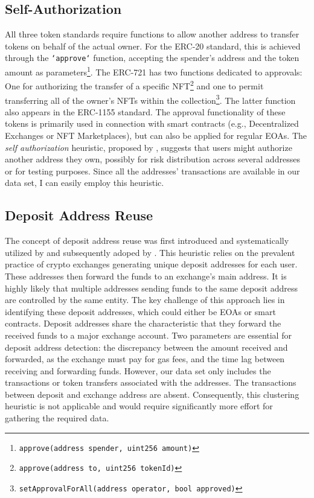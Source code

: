 \documentclass[12pt,a4paper,titlepage,oneside,english]{article}
\begin{document}
\subsection{Self-Authorization} 
	All three token standards require functions to allow another address to transfer tokens on behalf of the actual owner. For the ERC-20 standard, this is achieved through the \texttt{`approve`} function, accepting the spender's address and the token amount as parameters\footnote{\texttt{approve(address spender, uint256 amount)}}. The ERC-721 has two functions dedicated to approvals: One for authorizing the transfer of a specific NFT\footnote{\texttt{approve(address to, uint256 tokenId)}} and one to permit transferring all of the owner's NFTs within the collection\footnote{\texttt{setApprovalForAll(address operator, bool approved)}}. The latter function also appears in the ERC-1155 standard. The approval functionality of these tokens is primarily used in connection with smart contracts (e.g., Decentralized Exchanges or NFT Marketplaces), but can also be applied for regular EOAs. \newline
The \textit{self authorization} heuristic, proposed by \cite{FV:17}, suggests that users might authorize another address they own, possibly for risk distribution across several addresses or for testing purposes. Since all the addresses' transactions are available in our data set, I can easily employ this heuristic.

\subsection{Deposit Address Reuse}
The concept of deposit address reuse was first introduced and systematically utilized by \cite{FV:17} and subsequently adoped by \cite{wu2022tutela}. This heuristic relies on the prevalent practice of crypto exchanges generating unique deposit addresses for each user. These addresses then forward the funds to an exchange's main address. It is highly likely that multiple addresses sending funds to the same deposit address are controlled by the same entity. The key challenge of this approach lies in identifying these deposit addresses, which could either be EOAs or smart contracts. \citep{FV:17}\newline
Deposit addresses share the characteristic that they forward the received funds to a major exchange account. Two parameters are essential for deposit address detection: the discrepancy between the amount received and forwarded, as the exchange must pay for gas fees, and the time lag between receiving and forwarding funds.
However, our data set only includes the transactions or token transfers associated with the addresses. The transactions between deposit and exchange address are absent. Consequently, this clustering heuristic is not applicable and would require significantly more effort for gathering the required data.
\end{document}
